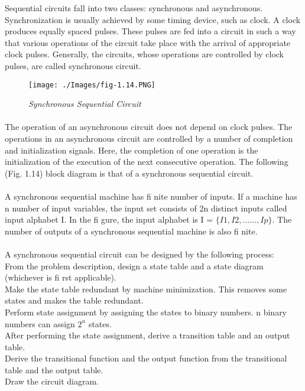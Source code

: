 \documentclass[10.5pt]{article}
\begin{document}
Sequential circuits fall into two classes: synchronous and asynchronous. Synchronization is usually
achieved by some timing device, such as clock. A clock produces equally spaced pulses. These pulses are fed into a circuit in such a way that various operations
of the circuit take place with the arrival of appropriate
clock pulses. Generally, the circuits, whose operations are
controlled by clock pulses, are called synchronous circuit.
\begin{wrapfigure}{!h!}{0.5\textwidth}
	\begin{center}	
		\texttt{[image: ./Images/fig-1.14.PNG]}
			\caption{\textit{Synchronous Sequential Circuit}}
  	\end{center}
\end{wrapfigure}

\paragraph{}
The operation of an asynchronous circuit does not
depend on clock pulses. The operations in an asynchronous
circuit are controlled by a number of completion
and initialization signals. Here, the completion of one
operation is the initialization of the execution of the next
consecutive operation. The following (Fig. 1.14) block
diagram is that of a synchronous sequential circuit.
\paragraph{}
A synchronous sequential machine has fi nite number
of inputs. If a machine has n number of input variables,
the input set consists of 2n distinct inputs called input
alphabet I.
In the fi gure, the input alphabet is I = $\{I1, I2, ……, Ip\}$.
The number of outputs of a synchronous sequential
machine is also fi nite.

\paragraph{}
A synchronous sequential circuit can be designed by the following process:\\
\indent\textbullet{}{}From the problem description, design a state table and a state diagram (whichever is fi rst applicable).\\
\indent\textbullet{}{}Make the state table redundant by machine minimization. This removes some states and makes the
table redundant.\\
\indent\textbullet{}{}Perform state assignment by assigning the states to binary numbers. n binary numbers can assign
$2^{n}$ states.\\
\indent\textbullet{}{}After performing the state assignment, derive a transition table and an output table.\\
\indent\textbullet{}{}Derive the transitional function and the output function from the transitional table and the output
table.\\
\indent\textbullet{}Draw the circuit diagram.\\
\end{document}

